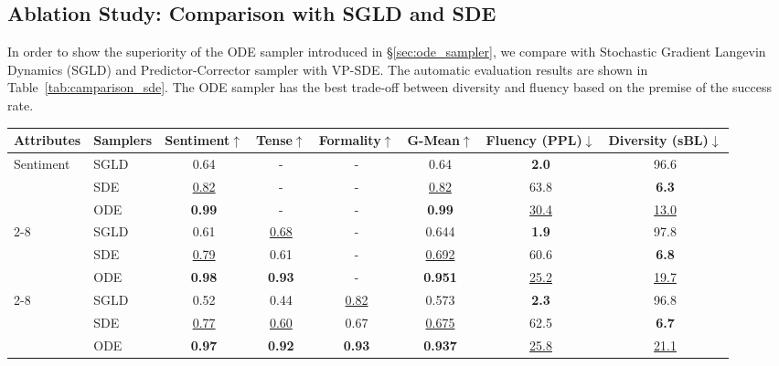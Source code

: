 \documentclass[11pt]{article}
\begin{document}
\subsection{Ablation Study: Comparison with SGLD and SDE}
\label{app:compare_sde}
In order to show the superiority of the ODE sampler introduced in \S\ref{sec:ode_sampler}, we compare with Stochastic Gradient Langevin Dynamics (SGLD) and Predictor-Corrector sampler with VP-SDE. The automatic evaluation results are shown in Table~\ref{tab:camparison_sde}. The ODE sampler has the best trade-off between diversity and fluency based on the premise of the success rate. 
\begin{table*}[ht]
\small
\centering
\begin{tabular}{llcccccc}
\toprule
Attributes           & Samplers    & Sentiment$\uparrow$ & Tense$\uparrow$ & Formality$\uparrow$ & G-Mean$\uparrow$& Fluency (PPL)$\downarrow$ &Diversity (sBL)$\downarrow$ \\
\midrule
\multirow{3}{*}{Sentiment}
                 & SGLD &0.64 &-&-&0.64 &\textbf{2.0} & 96.6\\
                 & SDE & \underline{0.82} & -&-& \underline{0.82}& 63.8 & \textbf{6.3} \\
                 & ODE &\textbf{0.99} &-&-&\textbf{0.99} & \underline{30.4} & \underline{13.0} \\
                 \cmidrule{2-8}
\multirow{3}{*}{\quad + Tense} 
                 & SGLD &0.61 &\underline{0.68}&-& 0.644&\textbf{1.9} & 97.8\\
                 & SDE & \underline{0.79} & 0.61&-& \underline{0.692}& 60.6 & \textbf{6.8} \\
                 & ODE &\textbf{0.98}& \textbf{0.93}& -&\textbf{0.951}& \underline{25.2}& \underline{19.7}\\
                 \cmidrule{2-8}
\multirow{3}{*}{\quad +Formality} 
                 & SGLD &0.52 &0.44&\underline{0.82}& 0.573&\textbf{2.3} & 96.8\\
                 & SDE & \underline{0.77} & \underline{0.60}&0.67& \underline{0.675}& 62.5 & \textbf{6.7} \\
                 & ODE &\textbf{0.97}& \textbf{0.92}& \textbf{0.93}&\textbf{0.937}   & \underline{25.8}& \underline{21.1}\\
                 \midrule
\end{tabular}
\caption{Comparison of different sampling method.}
\label{tab:camparison_sde}
\end{table*}
\end{document}
